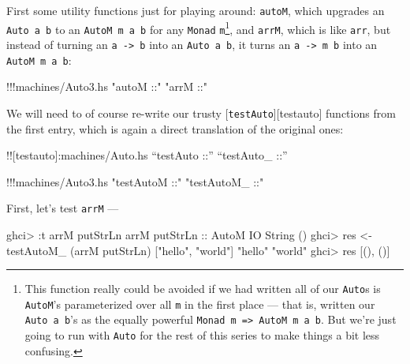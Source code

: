 \documentclass[]{article}
\newenvironment{Shaded}{}{}
\newcommand{\DataTypeTok}[1]{\textcolor[rgb]{0.56,0.13,0.00}{{#1}}}
\newcommand{\StringTok}[1]{\textcolor[rgb]{0.25,0.44,0.63}{{#1}}}
\newcommand{\OtherTok}[1]{\textcolor[rgb]{0.00,0.44,0.13}{{#1}}}
\newcommand{\FunctionTok}[1]{\textcolor[rgb]{0.02,0.16,0.49}{{#1}}}
\newcommand{\NormalTok}[1]{{#1}}
\begin{document}
First some utility functions just for playing around: \texttt{autoM},
which upgrades an \texttt{Auto\ a\ b} to an \texttt{AutoM\ m\ a\ b} for
any \texttt{Monad} \texttt{m}\footnote{This function really could be
  avoided if we had written all of our \texttt{Auto}s is
  \texttt{AutoM}'s parameterized over all \texttt{m} in the first place
  --- that is, written our \texttt{Auto\ a\ b}'s as the equally powerful
  \texttt{Monad\ m\ =\textgreater{}\ AutoM\ m\ a\ b}. But we're just
  going to run with \texttt{Auto} for the rest of this series to make
  things a bit less confusing.}, and \texttt{arrM}, which is like
\texttt{arr}, but instead of turning an \texttt{a\ -\textgreater{}\ b}
into an \texttt{Auto\ a\ b}, it turns an
\texttt{a\ -\textgreater{}\ m\ b} into an \texttt{AutoM\ m\ a\ b}:

\begin{Shaded}
\begin{Highlighting}[]
\FunctionTok{!!!}\NormalTok{machines}\FunctionTok{/}\NormalTok{Auto3.hs }\StringTok{"autoM ::"} \StringTok{"arrM ::"}
\end{Highlighting}
\end{Shaded}

We will need to of course re-write our trusty
{[}\texttt{testAuto}{]}{[}testauto{]} functions from the first entry,
which is again a direct translation of the original ones:

!!{[}testauto{]}:machines/Auto.hs ``testAuto ::'' ``testAuto\_ ::''

\begin{Shaded}
\begin{Highlighting}[]
\FunctionTok{!!!}\NormalTok{machines}\FunctionTok{/}\NormalTok{Auto3.hs }\StringTok{"testAutoM ::"} \StringTok{"testAutoM_ ::"}
\end{Highlighting}
\end{Shaded}

First, let's test \texttt{arrM} ---

\begin{Shaded}
\begin{Highlighting}[]
\NormalTok{ghci}\FunctionTok{>} \FunctionTok{:}\NormalTok{t arrM putStrLn}
\NormalTok{arrM}\OtherTok{ putStrLn ::} \DataTypeTok{AutoM} \DataTypeTok{IO} \DataTypeTok{String} \NormalTok{()}
\NormalTok{ghci}\FunctionTok{>} \NormalTok{res }\OtherTok{<-} \NormalTok{testAutoM_ (arrM putStrLn) [}\StringTok{"hello"}\NormalTok{, }\StringTok{"world"}\NormalTok{]}
\StringTok{"hello"}
\StringTok{"world"}
\NormalTok{ghci}\FunctionTok{>} \NormalTok{res}
\NormalTok{[(), ()]}
\end{Highlighting}
\end{Shaded}
\end{document}
